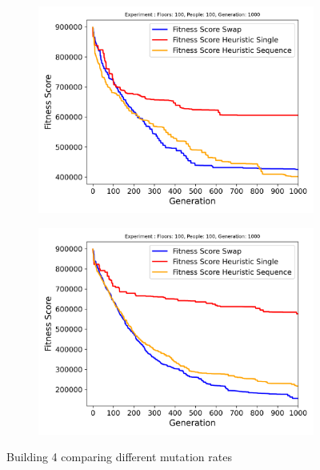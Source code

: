 \begin{figure}[h]
	\centering
	\begin{subfigure}[b]{0.49\linewidth}
		\centering
		\includegraphics[width=\linewidth]{results/Building4/Mutation_0.1/Floors: 100, People: 100, Generation: 1000_2_best.png}
		\label{fig:Building4/Mutation_0.1/Floors: 100, People: 100, Generation: 1000_2_best}
	\end{subfigure}
	\hfill
	\begin{subfigure}[b]{0.49\linewidth}
		\centering
		\includegraphics[width=\linewidth]{results/Building4/Mutation_0.6/Floors: 100, People: 100, Generation: 1000_best.png}
		\label{fig:Building4/Mutation_0.6/Floors: 100, People: 100, Generation: 1000_best}
	\end{subfigure}
	\hfill
	\caption{Building 4 comparing different mutation rates}
	\label{fig:Building 4 comparing different mutation rates}
\end{figure}